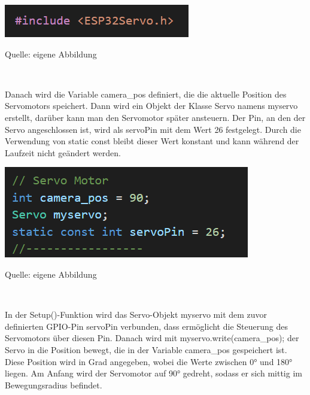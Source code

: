 \documentclass[ngerman,12pt,a4paper]{article}
\begin{document}
				\begin{center}
					\begin{minipage}[t]{0.4\textwidth}
						\includegraphics{Pictures/esp32servo}
						\label{fig:esp32-servo}
						\vspace{-10pt}
						\begin{center}
							\par\small Quelle: eigene Abbildung 
						\end{center}
					\end{minipage} \\[0.70cm]
				\end{center}
				Danach wird die Variable camera\_pos definiert, die die aktuelle Position des Servomotors speichert. Dann wird ein Objekt der Klasse Servo namens myservo erstellt, darüber kann man den Servomotor später ansteuern. Der Pin, an den der Servo angeschlossen ist, wird als servoPin mit dem Wert 26 festgelegt. Durch die Verwendung von static const bleibt dieser Wert konstant und kann während der Laufzeit nicht geändert werden.
				
				\begin{center}
					\begin{minipage}[t]{0.45\textwidth}
						\includegraphics{Pictures/servopins}
						\label{fig:servopins}
						\vspace{-10pt}
						\begin{center}
							\par\small Quelle: eigene Abbildung 
						\end{center}
					\end{minipage} \\[0.70cm]
				\end{center}
				In der Setup()-Funktion wird das Servo-Objekt myservo mit dem zuvor definierten GPIO-Pin servoPin verbunden, dass ermöglicht die Steuerung des Servomotors über diesen Pin. Danach wird mit myservo.write(camera\_pos); der Servo in die Position bewegt, die in der Variable camera\_pos gespeichert ist. Diese Position wird in Grad angegeben, wobei die Werte zwischen 0° und 180° liegen. Am Anfang wird der Servomotor auf 90° gedreht, sodass er sich mittig im Bewegungsradius befindet.
				
\end{document}
